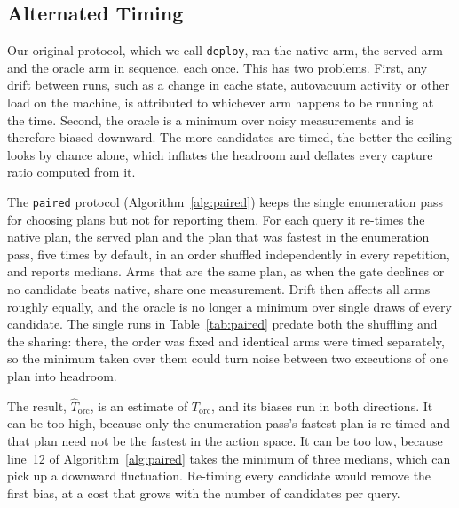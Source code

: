 \documentclass[conference]{IEEEtran}
\begin{document}
\subsection{Alternated Timing}
\label{sec:timing}

Our original protocol, which we call \texttt{deploy}, ran the native arm, the
served arm and the oracle arm in sequence, each once. This has two problems.
First, any drift between runs, such as a change in cache state, autovacuum
activity or other load on the machine, is attributed to whichever arm happens to
be running at the time. Second, the oracle is a minimum over noisy measurements
and is therefore biased downward. The more candidates are timed, the better the
ceiling looks by chance alone, which inflates the headroom and deflates every
capture ratio computed from it.

The \texttt{paired} protocol (Algorithm~\ref{alg:paired}) keeps the single
enumeration pass for choosing plans but not for reporting them. For each query
it re-times the native plan, the served plan and the plan that was fastest in
the enumeration pass, five times by default, in an order shuffled independently
in every repetition, and reports medians. Arms that are the same plan, as when
the gate declines or no candidate beats native, share one measurement. Drift
then affects all arms roughly equally, and the oracle is no longer a minimum
over single draws of every candidate. The single runs in
Table~\ref{tab:paired} predate both the shuffling and the sharing: there, the
order was fixed and identical arms were timed separately, so the minimum taken
over them could turn noise between two executions of one plan into headroom.

The result, $\widehat{T}_{\mathrm{orc}}$, is an estimate of $T_{\mathrm{orc}}$,
and its biases run in both directions. It can be too high, because only the
enumeration pass's fastest plan is re-timed and that plan need not be the
fastest in the action space. It can be too low, because line~12 of
Algorithm~\ref{alg:paired} takes the minimum of three medians, which can pick
up a downward fluctuation. Re-timing every candidate would remove the first
bias, at a cost that grows with the number of candidates per query.
\end{document}
